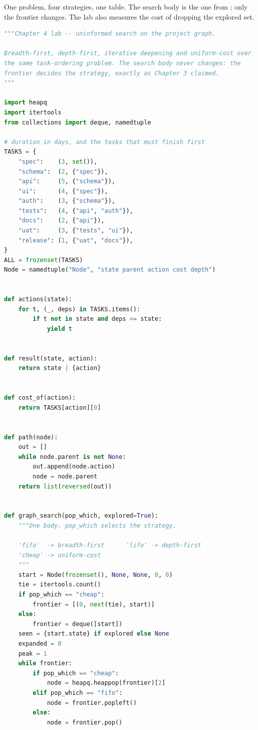 \begin{lab}
One problem, four strategies, one table. The search body is the one from
; only the frontier changes. The lab also measures the cost of
dropping the explored set.
\begin{lstlisting}[language=Python]
"""Chapter 4 lab -- uninformed search on the project graph.

Breadth-first, depth-first, iterative deepening and uniform-cost over
the same task-ordering problem. The search body never changes: the
frontier decides the strategy, exactly as Chapter 3 claimed.
"""

import heapq
import itertools
from collections import deque, namedtuple

# duration in days, and the tasks that must finish first
TASKS = {
    "spec":    (3, set()),
    "schema":  (2, {"spec"}),
    "api":     (5, {"schema"}),
    "ui":      (4, {"spec"}),
    "auth":    (3, {"schema"}),
    "tests":   (4, {"api", "auth"}),
    "docs":    (2, {"api"}),
    "uat":     (3, {"tests", "ui"}),
    "release": (1, {"uat", "docs"}),
}
ALL = frozenset(TASKS)
Node = namedtuple("Node", "state parent action cost depth")


def actions(state):
    for t, (_, deps) in TASKS.items():
        if t not in state and deps <= state:
            yield t


def result(state, action):
    return state | {action}


def cost_of(action):
    return TASKS[action][0]


def path(node):
    out = []
    while node.parent is not None:
        out.append(node.action)
        node = node.parent
    return list(reversed(out))


def graph_search(pop_which, explored=True):
    """One body. pop_which selects the strategy.

    'fifo'  -> breadth-first      'lifo' -> depth-first
    'cheap' -> uniform-cost
    """
    start = Node(frozenset(), None, None, 0, 0)
    tie = itertools.count()
    if pop_which == "cheap":
        frontier = [(0, next(tie), start)]
    else:
        frontier = deque([start])
    seen = {start.state} if explored else None
    expanded = 0
    peak = 1
    while frontier:
        if pop_which == "cheap":
            node = heapq.heappop(frontier)[2]
        elif pop_which == "fifo":
            node = frontier.popleft()
        else:
            node = frontier.pop()


\end{lstlisting}
\end{lab}
